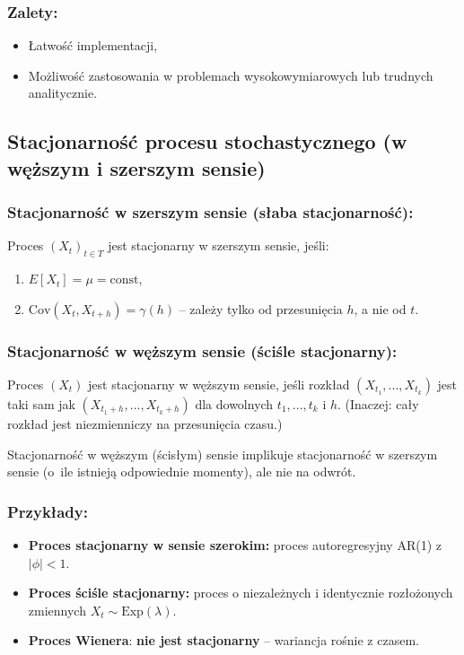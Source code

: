 \subsubsection*{Zalety:}
\begin{itemize}
    \item Łatwość implementacji,
    \item Możliwość zastosowania w problemach wysokowymiarowych lub trudnych analitycznie.
\end{itemize}

\subsection{Stacjonarność procesu stochastycznego (w węższym i szerszym sensie)}
\subsubsection*{Stacjonarność w szerszym sensie (słaba stacjonarność):}
Proces $(X_t)_{t \in T}$ jest stacjonarny w szerszym sensie, jeśli:

\begin{enumerate}
    \item $E[X_t] = \mu = \text{const}$,
    \item $\text{Cov}(X_t, X_{t+h}) = \gamma(h)$ -- zależy tylko od przesunięcia $h$, a nie od $t$.
\end{enumerate}

\subsubsection*{Stacjonarność w węższym sensie (ściśle stacjonarny):}
Proces $(X_t)$ jest stacjonarny w węższym sensie, jeśli rozkład $(X_{t_1}, ..., X_{t_k})$ jest taki sam jak $(X_{t_1+h}, ..., X_{t_k+h})$ dla dowolnych $t_1,...,t_k$ i $h$.
(Inaczej: cały rozkład jest niezmienniczy na przesunięcia czasu.)

\medskip
Stacjonarność w węższym (ścisłym) sensie implikuje stacjonarność w szerszym sensie (o~ile istnieją odpowiednie momenty), ale nie na odwrót.

\subsubsection*{Przykłady:}

\begin{itemize}
    \item \textbf{Proces stacjonarny w sensie szerokim:} proces autoregresyjny AR(1) z $|\phi| < 1$.
    \item \textbf{Proces ściśle stacjonarny:} proces o niezależnych i identycznie rozłożonych zmiennych $X_t \sim \text{Exp}(\lambda)$.
    \item \textbf{Proces Wienera}: \textbf{nie jest stacjonarny} -- wariancja rośnie z czasem.
\end{itemize}

